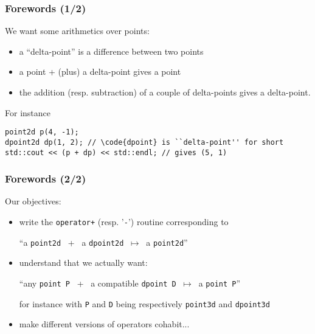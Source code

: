 \documentclass{beamer}
\newcommand{\code}[1]{{\scriptsize{\texttt{#1}}}\xspace}
\begin{document}
\begin{frame}[fragile]
  \frametitle{Forewords (1/2)}

We want some arithmetics over points:
\begin{itemize}
\item a ``delta-point'' is a difference between two points
\item a point + (plus) a delta-point gives a point
\item the addition (resp. subtraction) of a couple of delta-points gives a delta-point. 
\end{itemize}

\smallskip

For instance
\begin{lstlisting}
point2d p(4, -1);
dpoint2d dp(1, 2); // \code{dpoint} is ``delta-point'' for short
std::cout << (p + dp) << std::endl; // gives (5, 1)
\end{lstlisting}%

\end{frame}


\begin{frame}
  \frametitle{Forewords (2/2)}

Our objectives:

\begin{itemize}
\item write the \code{operator+} (resp. '\code{-}') routine corresponding to\\
  \begin{center}
    ``a \code{point2d} ~+~ a \code{dpoint2d} $~\mapsto~$ a
    \code{point2d}''
  \end{center}
\item understand that we actually want:\\
  \begin{center}
    ``any \code{point P} ~+~ a compatible \code{dpoint D} $~\mapsto~$
    a \code{point P}''
  \end{center}
  \scriptsize{for instance with \code{P} and \code{D} being
    respectively \code{point3d} and \code{dpoint3d}}
\item make different versions of operators cohabit...
\end{itemize}

\end{frame}
\end{document}
